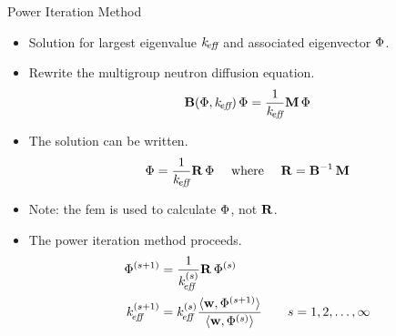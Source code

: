 \begin{frame}{Power Iteration Method}
  \begin{itemize}
    \item Solution for largest eigenvalue $k_{\!\mbox{\scriptsize \em eff}}$ and associated eigenvector
      $\Phi$.
    \item Rewrite the multigroup neutron diffusion equation.
      \begin{equation}
        \label{eq:gehin_notation}
        \mathbf{B}(\Phi,k_{\!\mbox{\scriptsize \em eff}}) \, \Phi = \frac{1}{k_{\!\mbox{\scriptsize \em eff}}} \mathbf{M} \, \Phi
      \end{equation}
    \item The solution can be written.
      \begin{equation}
        \Phi = \frac{1}{k_{\!\mbox{\scriptsize \em eff}}} \mathbf{R} \, \Phi \quad \text{ where } \quad
        \mathbf{R} = \mathbf{B}^{-1} \, \mathbf{M}
      \end{equation}
    \item Note: the \gls{fem} is used to calculate $\Phi$, not $\mathbf{R}$.
    \item The power iteration method proceeds.
      \begin{align}
        \label{eq:power_iteration_phi}
        \Phi^{(s+1)} &= \frac{1}{k_{\!\mbox{\scriptsize \em eff}}^{(s)}} \mathbf{R} \, \Phi^{(s)} \\
        \label{eq:power_iteration_eigenvalue}
        k_{\!\mbox{\scriptsize \em eff}}^{(s+1)} &= k_{\!\mbox{\scriptsize \em eff}}^{(s)} \frac{\langle \mathbf{w}, \Phi^{(s+1)} \rangle}
          {\langle \mathbf{w}, \Phi^{(s)}\rangle} \qquad s = 1,2,\ldots,\infty
      \end{align}

  \end{itemize}
\end{frame}


